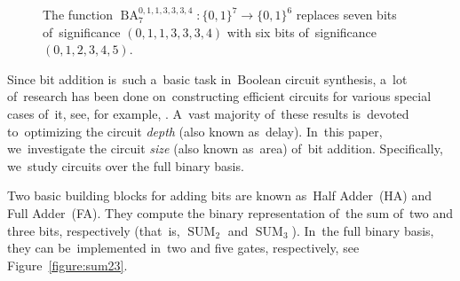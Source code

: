 \documentclass[sigconf, review, anonymous]{acmart}
\DeclareMathOperator{\SUM}{SUM}
\DeclareMathOperator{\BA}{BA}
\begin{document}
\begin{figure}%
	\begin{center}
	\end{center}
	\caption{The function $\BA_7^{0,1,1,3,3,3,4} \colon \{0,1\}^7 \to \{0,1\}^6$ replaces seven bits of~significance $(0,1,1,3,3,3,4)$ with six bits of~significance $(0,1,2,3,4,5)$.}
	\label{figure:baexample}
\end{figure}

Since bit addition is~such a~basic task in~Boolean circuit synthesis,
a~lot of~research has been done on~constructing efficient circuits
for various special cases of~it, see, for example,
\cite{DBLP:journals/cc/PatersonZ93,
    DBLP:conf/arith/MartelORS95,
    DBLP:journals/tc/StellingMOR98,
    DBLP:conf/arith/BickerstaffSS01}.
A~vast majority of~these results is~devoted to~optimizing the circuit \emph{depth} (also known as~delay).
In~this paper, we~investigate the circuit \emph{size} (also known as~area) of~bit addition. Specifically, we~study circuits over the full binary basis.

Two basic building blocks for adding bits are known as~Half Adder~(HA)
and Full Adder~(FA). They compute the binary representation of~the sum
of~two and three bits, respectively (that~is, $\SUM_2$ and $\SUM_3$).
In~the full binary basis, they can be~implemented in~two and five gates, respectively, see Figure~\ref{figure:sum23}.
\end{document}
